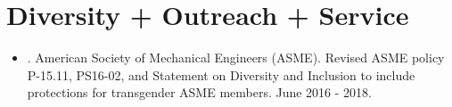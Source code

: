 \documentclass[letterpaper]{deedy-resume} %
\begin{document}
{%
%
%  
%
%
%
%
%
%


\section{Diversity + Outreach + Service}

\vspace{0.2cm}


\begin{itemize}

\item {.} American Society of Mechanical Engineers (ASME). Revised ASME policy P-15.11, PS16-02, and Statement on Diversity and Inclusion to include protections for transgender ASME members. June 2016 - 2018.


\end{itemize}}
\end{document}
